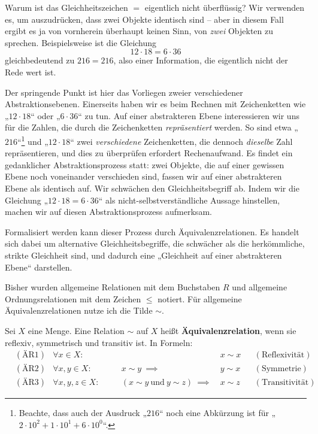 \begin{bem} \label{aequirelphilo}
    Warum ist das Gleichheitszeichen $=$ eigentlich nicht überflüssig? Wir verwenden es, um auszudrücken, dass zwei Objekte identisch sind -- aber in diesem Fall ergibt es ja von vornherein überhaupt keinen Sinn, von \emph{zwei} Objekten zu sprechen. Beispielsweise ist die Gleichung
        \[ 12\cdot 18 = 6\cdot 36 \]
    gleichbedeutend zu $216=216$, also einer Information, die eigentlich nicht der Rede wert ist.
    
    Der springende Punkt ist hier das Vorliegen zweier verschiedener Abstraktionsebenen. Einerseits haben wir es beim Rechnen mit Zeichenketten wie „$12\cdot 18$“ oder „$6\cdot 36$“ zu tun. Auf einer abstrakteren Ebene interessieren wir uns für die Zahlen, die durch die Zeichenketten \emph{repräsentiert} werden. So sind etwa „$216$“\footnote{Beachte, dass auch der Ausdruck „$216$“ noch eine Abkürzung ist für „$2\cdot 10^2 + 1\cdot 10^1 + 6 \cdot 10^0$“.} und „$12\cdot 18$“ zwei \emph{verschiedene} Zeichenketten, die dennoch \emph{dieselbe} Zahl repräsentieren, und dies zu überprüfen erfordert Rechenaufwand. Es findet ein gedanklicher Abstraktionsprozess statt: zwei Objekte, die auf einer gewissen Ebene noch voneinander verschieden sind, fassen wir auf einer abstrakteren Ebene als identisch auf. Wir schwächen den Gleichheitsbegriff ab. Indem wir die Gleichung „$12\cdot 18=6\cdot 36$“ als nicht-selbstverständliche Aussage hinstellen, machen wir auf diesen Abstraktionsprozess aufmerksam.
    
    Formalisiert werden kann dieser Prozess durch Äquivalenzrelationen. Es handelt sich dabei um alternative Gleichheitsbegriffe, die schwächer als die herkömmliche, strikte Gleichheit sind, und dadurch eine „Gleichheit auf einer abstrakteren Ebene“ darstellen.

    Bisher wurden allgemeine Relationen mit dem Buchstaben $R$ und allgemeine Ordnungsrelationen mit dem Zeichen $\le$ notiert. Für allgemeine Äquivalenzrelationen nutze ich die Tilde $\sim$.
\end{bem}


\begin{defin}[Äquivalenzrelation] \label{def:aequirel} 
    Sei $X$ eine Menge. Eine Relation $\sim$ auf $X$ heißt \textbf{Äquivalenzrelation}, wenn sie reflexiv, symmetrisch und transitiv ist. In Formeln:
    \begin{align*}
        & (\text{ÄR1}) & \forall x\in X:&&\quad & x\sim x && (\text{Reflexivität}) \\
        & (\text{ÄR2}) & \forall x,y\in X:&&\quad x\sim y\ \implies\ & y\sim x && (\text{Symmetrie}) \\
    & (\text{ÄR3}) & \forall x,y,z\in X:&&\quad (x\sim y\ \text{und}\ y\sim z)\ \implies\ & x\sim z && (\text{Transitivität})
    \end{align*}
\end{defin}


